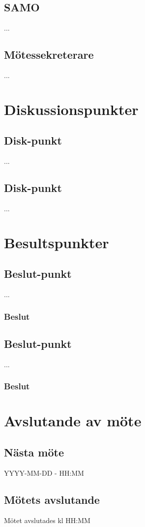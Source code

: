 \documentclass[protokoll]{dvd}
\begin{document}
\subsection{SAMO}
...

\subsection{Mötessekreterare}
...

\newpage


\section{Diskussionspunkter}
\subsection*{Disk-punkt}
...

\subsection*{Disk-punkt}
...


\section{Besultspunkter}

\subsection{Beslut-punkt}
...
\begin{attsatser}
    \item 
\end{attsatser}
\subsubsection{Beslut}
\begin{attsatser}
    \item %
\end{attsatser}

\subsection{Beslut-punkt}
...
\begin{attsatser}
    \item 
\end{attsatser}
\subsubsection{Beslut} 
\begin{attsatser}     
\item %
\end{attsatser}


\newpage
\section{Avslutande av möte}

\subsection{Nästa möte}
YYYY-MM-DD - HH:MM

\subsection{Mötets avslutande}
Mötet avslutades kl HH:MM 

\styrelsesignaturer
\end{document}

